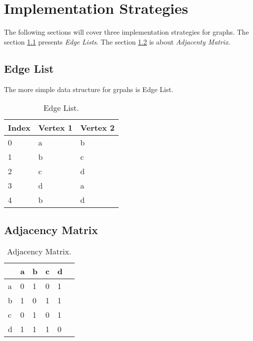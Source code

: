 \documentclass[a4paper]{article}
\begin{document}
    \section{Implementation Strategies}    
    
    The following sections will cover three implementation strategies for graphs.
    The section \ref{edgelist} presents \emph{Edge Lists}.
    The section \ref{adjacency_matrix} is about \emph{Adjacenty Matrix}.

    \subsection{Edge List} \label{edgelist}

    The more simple data structure for grpahs is Edge List.
   

    \begin{table}[H]
        \centering
        \caption{\label{tab:edge-list}Edge List.}
        \vspace*{10pt}
        \begin{tabular}{ |l|l|l| } 
            \hline
            Index & Vertex 1 & Vertex 2 \\
            \hline
            0   & a & b \\
            \hline
            1   & b & c \\
            \hline
            2   & c & d \\
            \hline
            3   & d & a \\
            \hline
            4   & b & d \\
            \hline            
        \end{tabular}
    \end{table}


    \subsection{Adjacency Matrix} \label{adjacency_matrix}

        
    \begin{table}[H]
        \centering
        \caption{\label{tab:adjacency-matrix}Adjacency Matrix.}
        \vspace*{10pt}
        \begin{tabular}{ l|l|l|l|l|l| } 
                & a & b & c & d \\
            \hline
            a   & 0 & 1 & 0 & 1 \\
            b   & 1 & 0 & 1 & 1 \\
            c   & 0 & 1 & 0 & 1 \\
            d   & 1 & 1 & 1 & 0 \\
            \hline
        \end{tabular}
    \end{table}
\end{document}
